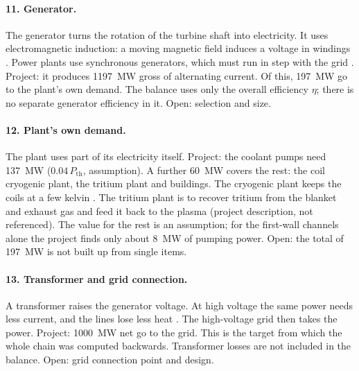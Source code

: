 \paragraph{11. Generator.} The generator turns the rotation of the turbine shaft into electricity. It uses electromagnetic induction: a moving magnetic field induces a voltage in windings \cite{bt_generator}. Power plants use synchronous generators, which must run in step with the grid \cite{bt_generator,bt_turbine}. Project: it produces \SI{1197}{MW} gross of alternating current. Of this, \SI{197}{MW} go to the plant's own demand. The balance uses only the overall efficiency $\eta$; there is no separate generator efficiency in it. Open: selection and size.

\paragraph{12. Plant's own demand.} The plant uses part of its electricity itself. Project: the coolant pumps need \SI{137}{MW} ($0.04\,P_\text{th}$, assumption). A further \SI{60}{MW} covers the rest: the coil cryogenic plant, the tritium plant and buildings. The cryogenic plant keeps the coils at a few kelvin \cite{bt_w7x_en}. The tritium plant is to recover tritium from the blanket and exhaust gas and feed it back to the plasma (project description, not referenced). The value for the rest is an assumption; for the first-wall channels alone the project finds only about \SI{8}{MW} of pumping power. Open: the total of \SI{197}{MW} is not built up from single items.

\paragraph{13. Transformer and grid connection.} A transformer raises the generator voltage. At high voltage the same power needs less current, and the lines lose less heat \cite{bt_transformer}. The high-voltage grid then takes the power. Project: \SI{1000}{MW} net go to the grid. This is the target from which the whole chain was computed backwards. Transformer losses are not included in the balance. Open: grid connection point and design.
